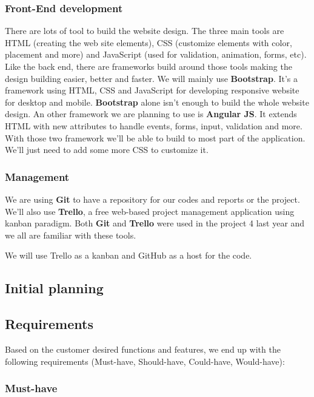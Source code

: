 \subsubsection{Front-End development}

There are lots of tool to build the website design. The three main tools are HTML (creating the web site elements), CSS (customize elements with color, placement and more) and JavaScript (used for validation, animation, forms, etc). Like the back end, there are frameworks build around those tools making the design building easier, better and faster. We will mainly use \textbf{Bootstrap}. It's a framework using HTML, CSS and JavaScript for developing responsive website for desktop and mobile. \textbf{Bootstrap} alone isn't enough to build the whole website design. An other framework we are planning to use is \textbf{Angular JS}. It extends HTML with new attributes to handle events, forms, input, validation and more. With those two framework we'll be able to build to most part of the application. We'll just need to add some more CSS to customize it.

\subsubsection{Management}

We are using \textbf{Git} to have a repository for our codes and reports or the project. We'll also use \textbf{Trello}, a free web-based project management application using kanban paradigm. Both \textbf{Git} and \textbf{Trello} were used in the project 4 last year and we all are familiar with these tools.

We will use Trello as a kanban and GitHub as a host for the code. \newline

\subsection{Initial planning}
\subsection{Requirements}
Based on the customer desired functions and features, we end up with the following requirements (Must-have, Should-have, Could-have, Would-have):

\subsubsection{Must-have}

